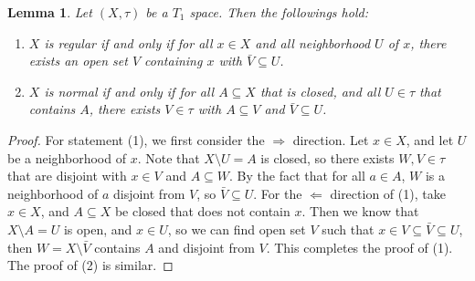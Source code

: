 \documentclass[11pt]{book}
\theoremstyle{break}
\theoremstyle{break}
\newtheorem{lem}{Lemma}[thm]
\begin{document}
\begin{lem}
Let $(X,\tau)$ be a $T_1$ space. Then the followings hold:
\begin{enumerate}[topsep=3pt,itemsep=-1ex,partopsep=1ex,parsep=1ex]
\item $X$ is regular if and only if for all $x \in X$ and all neighborhood $U$ of $x$, there exists an open set $V$ containing $x$ with $\bar{V} \subseteq U$. 
\item $X$ is normal if and only if for all $A \subseteq X$ that is closed, and all $U \in \tau$ that contains $A$, there exists $V \in \tau$ with $A \subseteq V$ and $\bar{V} \subseteq U$. 
\end{enumerate}
\end{lem}
\begin{proof}
For statement (1), we first consider the $\Rightarrow$ direction. Let $x \in X$, and let $U$ be a neighborhood of $x$. Note that $X \setminus U = A$ is closed, so there exists $W,V \in \tau$ that are disjoint with $x\in V$ and $A\subseteq W$. By the fact that for all $a \in A$, $W$ is a neighborhood of $a$ disjoint from $V$, so $\bar{V}\subseteq U$. For the $\Leftarrow$ direction of (1), take $x \in X$, and $A\subseteq X$ be closed that does not contain $x$. Then we know that $X\setminus A = U$ is open, and $x \in U$, so we can find open set $V$ such that $x \in V \subseteq \bar{V} \subseteq U$, then $W = X\setminus \bar{V}$ contains $A$ and disjoint from $V$. This completes the proof of (1). The proof of (2) is similar.
\end{proof}
\end{document}
